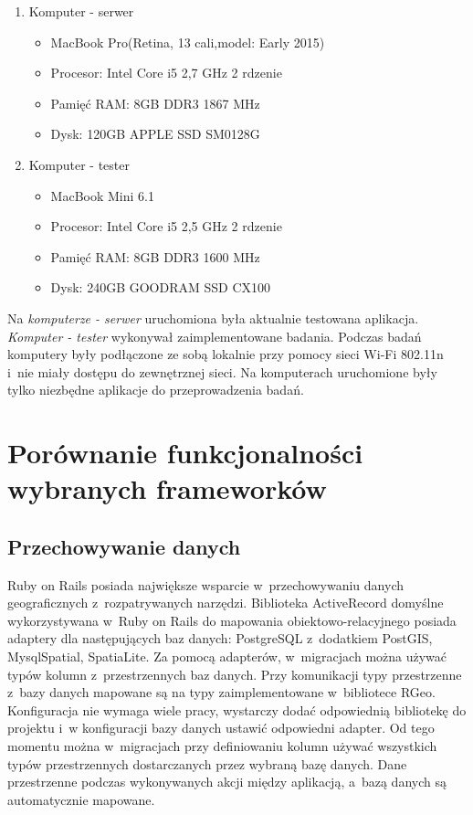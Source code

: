 \documentclass[archivemode]{mgr}
\begin{document}
\begin{enumerate}
\item Komputer - serwer
  \begin{itemize}
    \item MacBook Pro(Retina, 13 cali,model: Early 2015)
    \item Procesor: Intel Core i5 2,7 GHz 2 rdzenie
    \item Pamięć RAM: 8GB DDR3 1867 MHz
    \item Dysk: 120GB APPLE SSD SM0128G
  \end{itemize}
\item Komputer - tester
  \begin{itemize}
    \item MacBook Mini 6.1
    \item Procesor: Intel Core i5 2,5 GHz 2 rdzenie
    \item Pamięć RAM: 8GB DDR3 1600 MHz
    \item Dysk: 240GB GOODRAM SSD CX100
  \end{itemize}
\end{enumerate}

Na \textit{komputerze - serwer} uruchomiona była aktualnie testowana aplikacja. \textit{Komputer - tester} wykonywał zaimplementowane badania. Podczas badań komputery były podłączone ze sobą lokalnie przy pomocy sieci Wi-Fi 802.11n i~nie miały dostępu do zewnętrznej sieci. Na komputerach uruchomione były tylko niezbędne aplikacje do przeprowadzenia badań.

\section{Porównanie funkcjonalności wybranych frameworków}

\subsection{Przechowywanie danych}

 Ruby on Rails posiada największe wsparcie w~przechowywaniu danych geograficznych z~rozpatrywanych narzędzi. Biblioteka ActiveRecord domyślne wykorzystywana w~Ruby on Rails do mapowania obiektowo-relacyjnego posiada adaptery dla następujących baz danych: PostgreSQL z~dodatkiem PostGIS, MysqlSpatial, SpatiaLite. Za pomocą adapterów, w~migracjach można używać typów kolumn z~przestrzennych baz danych. Przy komunikacji typy przestrzenne z~bazy danych mapowane są na typy zaimplementowane w~bibliotece RGeo. Konfiguracja nie wymaga wiele pracy, wystarczy dodać odpowiednią bibliotekę do projektu i~w konfiguracji bazy danych ustawić odpowiedni adapter. Od tego momentu można w~migracjach przy definiowaniu kolumn używać wszystkich typów przestrzennych dostarczanych przez wybraną bazę danych. Dane przestrzenne podczas wykonywanych akcji między aplikacją, a~bazą danych są automatycznie mapowane.
\end{document}

